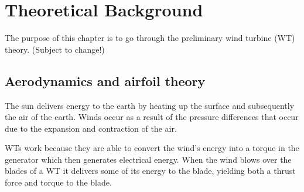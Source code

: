 \section{Theoretical Background} \label{sec:theory}
The purpose of this chapter is to go through the preliminary wind turbine (WT) theory. (Subject to change!)

\subsection{Aerodynamics and airfoil theory} \label{sec:theory_aero}
The sun delivers energy to the earth by heating up the surface and subsequently the air of the earth. Winds occur as a result of the pressure differences that occur due to the expansion and contraction of the air. 

WTs work because they are able to convert the wind's energy into a torque in the generator which then generates electrical energy. When the wind blows over the blades of a WT it delivers some of its energy to the blade, yielding both a thrust force and torque to the blade.

